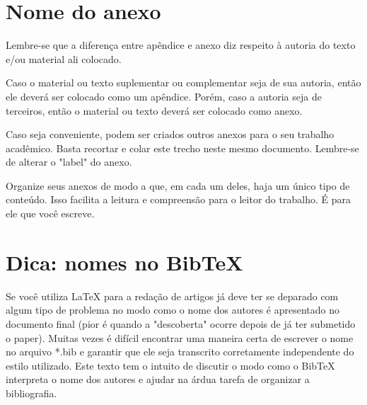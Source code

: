 
\begin{anexosenv}
\partanexos


\chapter{Nome do anexo}     %
\label{chap:anexoA}

Lembre-se que a diferença entre apêndice e anexo diz respeito à autoria do texto e/ou material ali colocado.

Caso o material ou texto suplementar ou complementar seja de sua autoria, então ele deverá ser colocado como um apêndice. Porém, caso a autoria seja de terceiros, então o material ou texto deverá ser colocado como anexo.

Caso seja conveniente, podem ser criados outros anexos para o seu trabalho acadêmico. Basta recortar e colar este trecho neste mesmo documento. Lembre-se de alterar o "label"{} do anexo.

Organize seus anexos de modo a que, em cada um deles, haja um único tipo de conteúdo. Isso facilita a leitura e compreensão para o leitor do trabalho. É para ele que você escreve.


\chapter{Dica: nomes no BibTeX}
\label{chap:anexoB}

Se você utiliza LaTeX para a redação de artigos já deve ter se deparado com algum tipo de problema no modo como o nome dos autores é apresentado no documento final (pior é quando a "descoberta"{} ocorre depois de já ter submetido o paper). Muitas vezes é difícil encontrar uma maneira certa de escrever o nome no arquivo *.bib e garantir que ele seja transcrito corretamente independente do estilo utilizado. Este texto tem o intuito de discutir o modo como o BibTeX interpreta o nome dos autores e ajudar na árdua tarefa de organizar a bibliografia.


\end{anexosenv}
